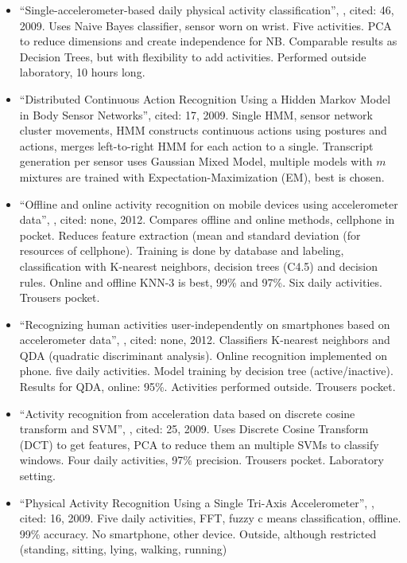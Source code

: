 \begin{itemize}
  \item ``Single-accelerometer-based daily physical activity classification'', \cite{long2009single}, cited: 46, 2009. Uses Naive Bayes classifier, sensor worn on wrist. Five activities. PCA to reduce dimensions and create independence for NB. Comparable results as Decision Trees, but with flexibility to add activities. Performed outside laboratory, 10 hours long.
  \item ``Distributed Continuous Action Recognition Using a Hidden Markov Model in Body Sensor Networks'', \cite{guenterberg2009distributed} cited: 17, 2009. Single HMM, sensor network cluster movements, HMM constructs continuous actions using postures and actions, merges left-to-right HMM for each action to a single. Transcript generation per sensor uses Gaussian Mixed Model, multiple models with $m$ mixtures are trained with Expectation-Maximization (EM), best is chosen.
  \item ``Offline and online activity recognition on mobile devices using accelerometer data'', \cite{duque2012offline}, cited: none, 2012. Compares offline and online methods, cellphone in pocket. Reduces feature extraction (mean and standard deviation (for resources of cellphone). Training is done by database and labeling, classification with K-nearest neighbors, decision trees (C4.5) and decision rules. Online and offline KNN-3 is best, 99\% and 97\%. Six daily activities. Trousers pocket.
  \item ``Recognizing human activities user-independently on smartphones based on accelerometer data'', \cite{siirtola2012recognizing}, cited: none, 2012. Classifiers K-nearest neighbors and QDA (quadratic discriminant analysis). Online recognition implemented on phone. five daily activities. Model training by decision tree (active/inactive). Results for QDA, online: 95\%. Activities performed outside. Trousers pocket.
  \item ``Activity recognition from acceleration data based on discrete cosine transform and SVM'', \cite{he2009activity}, cited: 25, 2009. Uses Discrete Cosine Transform (DCT) to get features, PCA to reduce them an multiple SVMs to classify windows. Four daily activities, 97\% precision. Trousers pocket. Laboratory setting.
  \item ``Physical Activity Recognition Using a Single Tri-Axis Accelerometer'', \cite{lee2178physical}, cited: 16, 2009. Five daily activities, FFT, fuzzy c means classification, offline. 99\% accuracy. No smartphone, other device. Outside, although restricted (standing, sitting, lying, walking, running)
\end{itemize}
